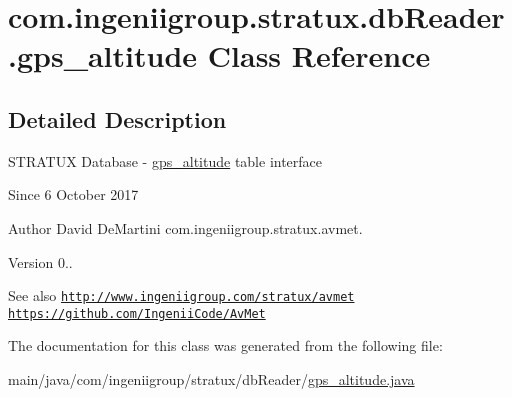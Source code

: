 \hypertarget{classcom_1_1ingeniigroup_1_1stratux_1_1db_reader_1_1gps__altitude}{}\section{com.\+ingeniigroup.\+stratux.\+db\+Reader.\+gps\+\_\+altitude Class Reference}
\label{classcom_1_1ingeniigroup_1_1stratux_1_1db_reader_1_1gps__altitude}


\subsection{Detailed Description}
S\+T\+R\+A\+T\+UX Database -\/ \hyperlink{classcom_1_1ingeniigroup_1_1stratux_1_1db_reader_1_1gps__altitude}{gps\+\_\+altitude} table interface

\begin{DoxySince}{Since}
6 October 2017 
\end{DoxySince}
\begin{DoxyAuthor}{Author}
David De\+Martini  com.\+ingeniigroup.\+stratux.\+avmet. 
\end{DoxyAuthor}
\begin{DoxyVersion}{Version}
0.. 
\end{DoxyVersion}
\begin{DoxySeeAlso}{See also}
\href{http://www.ingeniigroup.com/stratux/avmet}{\tt http\+://www.\+ingeniigroup.\+com/stratux/avmet}  \href{https://github.com/IngeniiCode/AvMet}{\tt https\+://github.\+com/\+Ingenii\+Code/\+Av\+Met} 
\end{DoxySeeAlso}


The documentation for this class was generated from the following file\+:\begin{DoxyCompactItemize}
\item 
main/java/com/ingeniigroup/stratux/db\+Reader/\hyperlink{gps__altitude_8java}{gps\+\_\+altitude.\+java}\end{DoxyCompactItemize}
